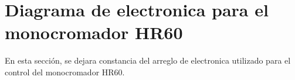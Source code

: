 \section{Diagrama de electronica para el monocromador HR60}
\label{appendix:diagram}

En esta sección, se dejara constancia del arreglo de electronica utilizado para el control del monocromador HR60.

